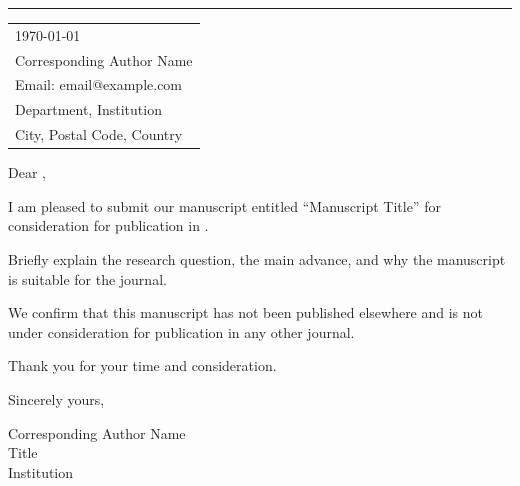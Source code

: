 \documentclass[11pt]{article}
\begin{document}
\rule{\linewidth}{1pt}

\bigskip\bigskip

\hfill
\begin{tabular}{l @{}}
\hfill \today \bigskip\\
\hfill Corresponding Author Name \\
\hfill Email: email@example.com \\
\hfill Department, Institution \\
\hfill City, Postal Code, Country \\
\end{tabular}

\bigskip

Dear \editorname{},

\bigskip

I am pleased to submit our manuscript entitled ``Manuscript Title'' for
consideration for publication in \journal{}.

Briefly explain the research question, the main advance, and why the manuscript
is suitable for the journal.

We confirm that this manuscript has not been published elsewhere and is not
under consideration for publication in any other journal.

Thank you for your time and consideration.

\bigskip

Sincerely yours,

\vspace{40pt}

Corresponding Author Name\\
Title\\
Institution
\end{document}
